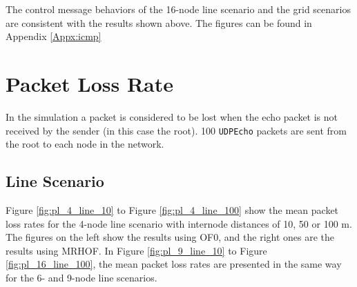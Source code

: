 The control message behaviors of the 16-node line scenario and the grid scenarios are consistent with the results shown above. The figures can be found in Appendix \ref{Appx:icmp}

\clearpage
\section{Packet Loss Rate}
\label{pl}

In the simulation a packet is considered to be lost when the echo packet is not received by the sender (in this case the root). 100 \texttt{UDPEcho} packets are sent from the root to each node in the network.

\subsection{Line Scenario}
\label{pl:line}

Figure \ref{fig:pl_4_line_10} to Figure \ref{fig:pl_4_line_100} show the mean packet loss rates for the 4-node line scenario with internode distances of 10, 50 or 100 m. The figures on the left show the results using OF0, and the right ones are the results using MRHOF. In Figure \ref{fig:pl_9_line_10} to Figure \ref{fig:pl_16_line_100}, the mean packet loss rates are presented in the same way for the 6- and 9-node line scenarios.

